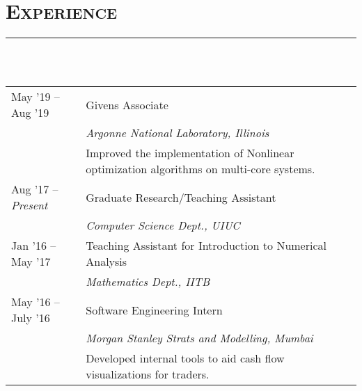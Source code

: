 \documentclass[letterpaper, 13pt]{article}
\begin{document}
\section*{\Large\textsc{Experience}}
\vspace{-4ex}
\rule{\textwidth}{0.1ex}\\
\vspace{1ex}\\
\begin{tabular}{p{} p{}}
May '19 -- Aug '19          &   Givens Associate\\
                            &   \textit{\small Argonne National Laboratory, Illinois}\\
                            & {\small Improved the implementation of Nonlinear optimization algorithms on multi-core systems.}\vspace{1ex}\\
Aug '17 -- \textit{Present} &   Graduate Research/Teaching Assistant\\
                            &   \textit{\small Computer Science Dept., UIUC}\vspace{1ex}\\
Jan '16 -- May '17          &   Teaching Assistant for Introduction to Numerical Analysis\\
                            &   \textit{\small Mathematics Dept., IITB}\vspace{1ex}\\
May '16 -- July '16         &   Software Engineering Intern\\
                            &   \textit{\small Morgan Stanley Strats and Modelling, Mumbai}\\
                            & Developed internal tools to aid cash flow visualizations for traders.
\end{tabular}




\nocite{*}
\printbibliography[title={\Large\textsc{Publications}\vspace*{-2ex}\\\rule{\textwidth}{0.1ex}},filter=papers]
\printbibliography[title={\Large\textsc{Talks}\vspace*{-2ex}\\\rule{\textwidth}{0.1ex}},type=inproceedings, resetnumbers=true]


\end{document}
